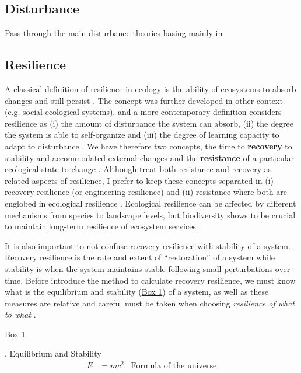 \subsection{Disturbance}
Pass through the main disturbance theories basing mainly in \citet{Pulsford2016}

\subsection{Resilience}\label{res}

A classical definition of resilience in ecology is the ability of ecosystems to absorb changes and still persist \citep{Holling1973}.
The concept was further developed in other context (e.g. social-ecological systems), and a more contemporary definition considers resilience as (i) the amount of disturbance the system can absorb, (ii) the degree the system is able to self-organize and (iii) the degree of learning capacity to adapt to disturbance \citep{Cumming2011}.
We have therefore two concepts, the time to \textbf{recovery} to stability and accommodated external changes \citep{pimm1984,Folke2002} and the \textbf{resistance} of a particular ecological state to change \citep{Peterson1998}.
Although \citet{Oliver2015} treat both resistance and recovery as related aspects of resilience, I prefer to keep these concepts separated in (i) recovery resilience (or engineering resilience) and (ii) resistance where both are englobed in ecological resilience \citep{Hodgson2015,Nimmo2015}.
Ecological resilience can be affected by different mechanisms from species to landscape levels, but biodiversity shows to be crucial to maintain long-term resilience of ecosystem services \citep{Oliver2015}.

It is also important to not confuse recovery resilience with stability of a system.
Recovery resilience is the rate and extent of ``restoration'' of a system while stability is when the system maintains stable following small perturbations over time.
Before introduce the method to calculate recovery resilience, we must know what is the equilibrium and stability (\hyperlink{box1}{Box 1}) of a system, as well as these measures are relative and careful must be taken when choosing \textit{resilience of what to what} \citep{Carpenter2001}.

\begin{tcolorbox}
\hypertarget{box1}{Box 1}. Equilibrium and Stability
\begin{align}
E &= mc^2 & \text{Formula of the universe}
\end{align}
\end{tcolorbox}

